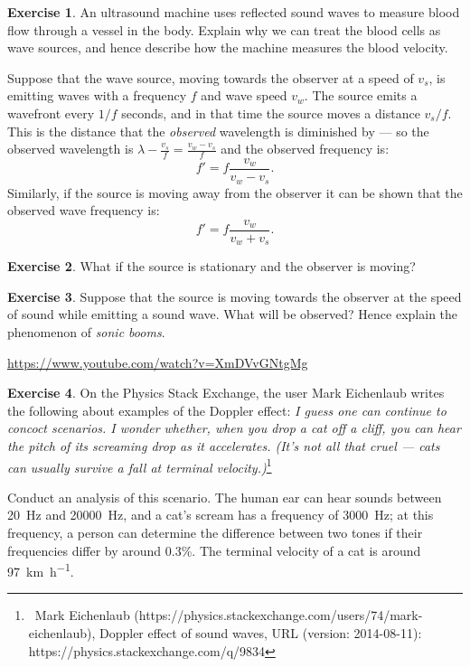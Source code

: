 \documentclass[a4paper]{amsbook}
\newcommand{\marginsymbol}{}
\newcommand{\goandwatch}[1]{
\begin{center}
\begin{tcolorbox}[width=0.8\textwidth,colback={SkyBlue!20},title={\textbf{Go and watch...}},colbacktitle=MidnightBlue,coltitle=White]
  \textcolor{MidnightBlue}{\url{#1}}
\end{tcolorbox}
\end{center}}
\theoremstyle{definition}
\newtheorem{exercise}{Exercise}
\numberwithin{exercise}{chapter}
\numberwithin{exercise}{chapter}
\begin{document}
\begin{exercise}
  An ultrasound machine uses reflected sound waves to measure blood flow through a vessel in the body. Explain why we can
  treat the blood cells as wave sources, and hence describe how the machine measures the blood velocity.
\end{exercise}

\marginsymbol Suppose that the wave source, moving towards the observer at a speed of $ v_s $, is emitting waves with a frequency $ f $ and
wave speed $ v_w $. The source emits a wavefront every $ 1/f $ seconds, and in that time the source moves a distance $ v_s/f $. This
is the distance that the \textit{observed} wavelength is diminished by --- so the observed wavelength is $ \lambda - \frac{v_s}{f} = \frac{v_w - v_s}{f} $
and the observed frequency is:
\begin{equation}
  f' = f \frac{v_w}{v_w - v_s}.
\end{equation}
Similarly, if the source is moving away from the observer it can be shown that the observed wave frequency is:
\begin{equation}
  f' = f \frac{v_w}{v_w + v_s}.
\end{equation}

\begin{exercise}
  What if the source is stationary and the observer is moving?
\end{exercise}

\begin{exercise}
  Suppose that the source is moving towards the observer at the speed of sound while emitting a sound
  wave. What will be observed? Hence explain the phenomenon of \textit{sonic booms}.
\end{exercise}

\goandwatch{https://www.youtube.com/watch?v=XmDVvGNtgMg}

\begin{exercise}
  On the Physics Stack Exchange, the user Mark Eichenlaub writes the following about examples of the Doppler effect:
  \textit{I guess one can continue to concoct scenarios. I wonder whether, when you drop a cat off a cliff, you can hear the pitch of
  its screaming drop as it accelerates. (It's not all that cruel --- cats can usually survive a fall at terminal
  velocity.)}\footnote{~Mark Eichenlaub (https://physics.stackexchange.com/users/74/mark-eichenlaub), Doppler effect of sound waves, URL (version: 2014-08-11): https://physics.stackexchange.com/q/9834}

  Conduct an analysis of this scenario. The human ear can hear sounds between \SI{20}{\hertz} and \SI{20 000}{\hertz}, and a cat's scream
  has a frequency of \SI{3000}{\hertz}; at this frequency, a person can determine the difference between two tones if their frequencies
  differ by around 0.3\%. The terminal velocity of a cat is around \SI{97}{\kilo\metre\per\hour}.
\end{exercise}
\end{document}
